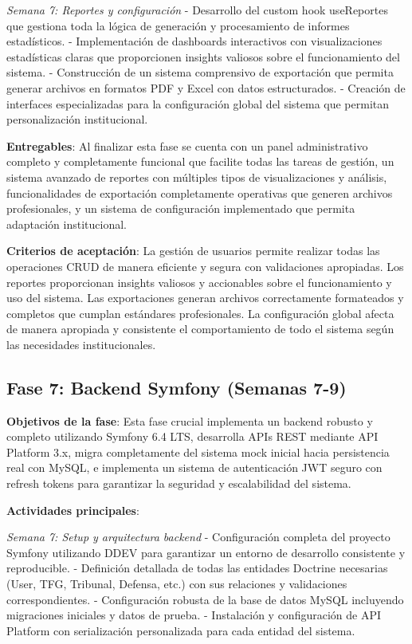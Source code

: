 \documentclass[12pt,a4paper,oneside]{report}
\begin{document}
\emph{Semana 7: Reportes y configuración} - Desarrollo del custom hook useReportes que gestiona toda la lógica de generación y procesamiento de informes estadísticos. - Implementación de dashboards interactivos con visualizaciones estadísticas claras que proporcionen insights valiosos sobre el funcionamiento del sistema. - Construcción de un sistema comprensivo de exportación que permita generar archivos en formatos PDF y Excel con datos estructurados. - Creación de interfaces especializadas para la configuración global del sistema que permitan personalización institucional.

\textbf{Entregables}: Al finalizar esta fase se cuenta con un panel administrativo completo y completamente funcional que facilite todas las tareas de gestión, un sistema avanzado de reportes con múltiples tipos de visualizaciones y análisis, funcionalidades de exportación completamente operativas que generen archivos profesionales, y un sistema de configuración implementado que permita adaptación institucional.

\textbf{Criterios de aceptación}: La gestión de usuarios permite realizar todas las operaciones CRUD de manera eficiente y segura con validaciones apropiadas. Los reportes proporcionan insights valiosos y accionables sobre el funcionamiento y uso del sistema. Las exportaciones generan archivos correctamente formateados y completos que cumplan estándares profesionales. La configuración global afecta de manera apropiada y consistente el comportamiento de todo el sistema según las necesidades institucionales.

\subsection{Fase 7: Backend Symfony (Semanas
7-9)}\label{fase-7-backend-symfony-semanas-7-9}

\textbf{Objetivos de la fase}: Esta fase crucial implementa un backend robusto y completo utilizando Symfony 6.4 LTS, desarrolla APIs REST mediante API Platform 3.x, migra completamente del sistema mock inicial hacia persistencia real con MySQL, e implementa un sistema de autenticación JWT seguro con refresh tokens para garantizar la seguridad y escalabilidad del sistema.

\textbf{Actividades principales}:

\emph{Semana 7: Setup y arquitectura backend} - Configuración completa del proyecto Symfony utilizando DDEV para garantizar un entorno de desarrollo consistente y reproducible. - Definición detallada de todas las entidades Doctrine necesarias (User, TFG, Tribunal, Defensa, etc.) con sus relaciones y validaciones correspondientes. - Configuración robusta de la base de datos MySQL incluyendo migraciones iniciales y datos de prueba. - Instalación y configuración de API Platform con serialización personalizada para cada entidad del sistema.
\end{document}
